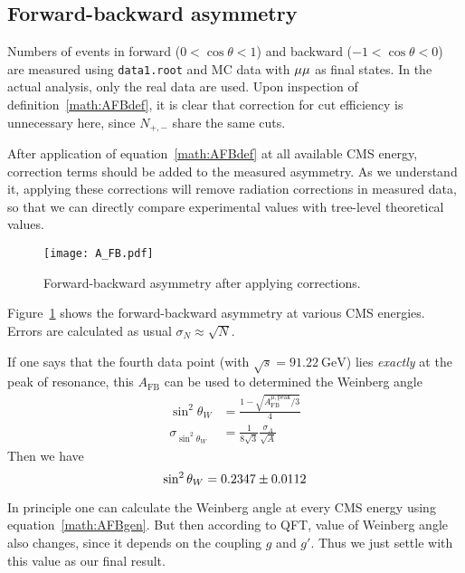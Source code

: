 \subsection{Forward-backward asymmetry}
Numbers of events in forward ($0 <\cos\theta<1$) and backward ($-1<\cos\theta<0$) are measured using \verb|data1.root| and MC data with $\mu\mu$ as final states. In the actual analysis, only the real data are used. Upon inspection of definition~\ref{math:AFBdef}, it is clear that correction for cut efficiency is unnecessary here, since $N_{+,-}$ share the same cuts.

After application of equation~\ref{math:AFBdef} at all available CMS energy, correction terms should be added to the measured asymmetry. As we understand it, applying these corrections will remove radiation corrections in measured data, so that we can directly compare experimental values with tree-level theoretical values.
\begin{figure}[ht]
	\centering
	\texttt{[image: A\_FB.pdf]}
	\caption{Forward-backward asymmetry after applying corrections. }%
	\label{fig:A_FB}
\end{figure}

Figure~\ref{fig:A_FB} shows the forward-backward asymmetry at various CMS energies. Errors are calculated as usual $\sigma_N \approx \sqrt{N}$.

If one says that the fourth data point (with $\sqrt{s} =\SI{91.22}{\giga\eV}$) lies \textit{exactly} at the peak of resonance, this $A_\text{FB}$ can be used to determined the Weinberg angle
\begin{align*}
	\sin^2\theta_W &= \frac{1-\sqrt{A^{\mu, \text{peak}}_{\text{FB}}/3}}{4} \\
	\sigma_{\sin^2\theta_W} &= \frac{1}{8\sqrt{3}} \frac{\sigma_A}{\sqrt{A}}	
\end{align*}
Then we have
\begin{equation}
	\sin^2\theta_W = \num{0.2347 +- 0.0112}
\end{equation}

In principle one can calculate the Weinberg angle at every CMS energy using equation~\ref{math:AFBgen}. But then according to QFT, value of Weinberg angle also changes, since it depends on the coupling $g$ and $g'$. Thus we just settle with this value as our final result.

